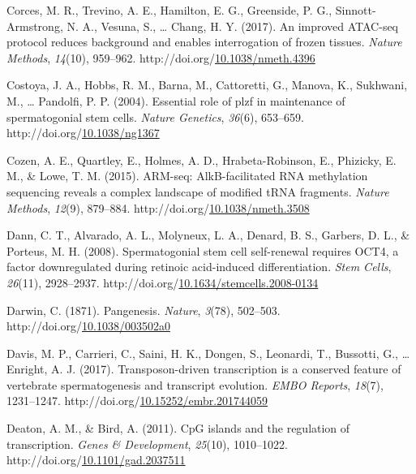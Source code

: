 \documentclass[12pt,twoside]{reedthesis}
\newlength{\cslhangindent}
\newenvironment{CSLReferences}[2] %
 {%
  \setlength{\parindent}{0pt}
  \ifodd #1 \everypar{\setlength{\hangindent}{\cslhangindent}}\ignorespaces\fi
  \ifnum #2 > 0
  \setlength{\parskip}{#2\baselineskip}
  \fi
 }%
 {}
\begin{document}
\begin{CSLReferences}{1}{0}
\leavevmode{}%
Corces, M. R., Trevino, A. E., Hamilton, E. G., Greenside, P. G., Sinnott-Armstrong, N. A., Vesuna, S., \ldots{} Chang, H. Y. (2017). An improved ATAC-seq protocol reduces background and enables interrogation of frozen tissues. \emph{Nature Methods}, \emph{14}(10), 959--962. http://doi.org/\href{https://doi.org/10.1038/nmeth.4396}{10.1038/nmeth.4396}

\leavevmode{}%
Costoya, J. A., Hobbs, R. M., Barna, M., Cattoretti, G., Manova, K., Sukhwani, M., \ldots{} Pandolfi, P. P. (2004). Essential role of plzf in maintenance of spermatogonial stem cells. \emph{Nature Genetics}, \emph{36}(6), 653--659. http://doi.org/\href{https://doi.org/10.1038/ng1367}{10.1038/ng1367}

\leavevmode{}%
Cozen, A. E., Quartley, E., Holmes, A. D., Hrabeta-Robinson, E., Phizicky, E. M., \& Lowe, T. M. (2015). ARM-seq: AlkB-facilitated RNA methylation sequencing reveals a complex landscape of modified tRNA fragments. \emph{Nature Methods}, \emph{12}(9), 879--884. http://doi.org/\href{https://doi.org/10.1038/nmeth.3508}{10.1038/nmeth.3508}

\leavevmode{}%
Dann, C. T., Alvarado, A. L., Molyneux, L. A., Denard, B. S., Garbers, D. L., \& Porteus, M. H. (2008). Spermatogonial stem cell self-renewal requires OCT4, a factor downregulated during retinoic acid-induced differentiation. \emph{Stem Cells}, \emph{26}(11), 2928--2937. http://doi.org/\href{https://doi.org/10.1634/stemcells.2008-0134}{10.1634/stemcells.2008-0134}

\leavevmode{}%
Darwin, C. (1871). Pangenesis. \emph{Nature}, \emph{3}(78), 502--503. http://doi.org/\href{https://doi.org/10.1038/003502a0}{10.1038/003502a0}

\leavevmode{}%
Davis, M. P., Carrieri, C., Saini, H. K., Dongen, S., Leonardi, T., Bussotti, G., \ldots{} Enright, A. J. (2017). Transposon{-}driven transcription is a conserved feature of vertebrate spermatogenesis and transcript evolution. \emph{EMBO Reports}, \emph{18}(7), 1231--1247. http://doi.org/\href{https://doi.org/10.15252/embr.201744059}{10.15252/embr.201744059}

\leavevmode{}%
Deaton, A. M., \& Bird, A. (2011). CpG islands and the regulation of transcription. \emph{Genes \& Development}, \emph{25}(10), 1010--1022. http://doi.org/\href{https://doi.org/10.1101/gad.2037511}{10.1101/gad.2037511}


\end{CSLReferences}
\end{document}
